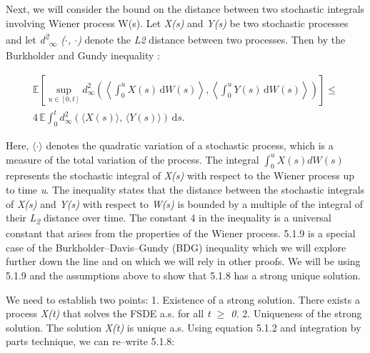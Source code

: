 \documentclass[12pt,a4paper]{report}
\numberwithin{equation}{section}
\begin{document}
Next, we will consider the bound on the distance between two stochastic
integrals involving Wiener process W(s). Let \emph{X(s)} and \emph{Y(s)}
be two stochastic processes and let
\emph{d\textsuperscript{2}\textsubscript{$\infty$} ($\cdot$, $\cdot$)} denote the \emph{L2}
distance between two processes. Then by the Burkholder and Gundy
inequality \cite{dl1979extrapolation_85}:

\begin{equation}\tag{5.1.9}\label{eq:5.1.9}
\begin{gathered}
\mathbb{E}\!\left[\sup_{u\in[0,t]}
d_{\infty}^{2}\!\left(
\left\langle \int_{0}^{u} X(s)\,\mathrm{d}W(s)\right\rangle,
\left\langle \int_{0}^{u} Y(s)\,\mathrm{d}W(s)\right\rangle
\right)\right]
\le \\[2pt]
4\,\mathbb{E}\!\int_{0}^{t}
d_{\infty}^{2}\!\left(\langle X(s)\rangle,\,\langle Y(s)\rangle\right)\,\mathrm{d}s.
\end{gathered}
\end{equation}



Here, $\langle$$\cdot$$\rangle$ denotes the quadratic variation of a stochastic process,
which is a measure of the total variation of the process. The integral
\(\int_{0}^{u}{X(s)dW(s)}\)represents the stochastic integral of
\emph{X(s)} with respect to the Wiener process up to time \emph{u}. The
inequality states that the distance between the stochastic integrals of
\emph{X(s)} and \emph{Y(s)} with respect to \emph{W(s)} is bounded by a
multiple of the integral of their \emph{L\textsubscript{2}} distance over time. The
constant 4 in the inequality is a universal constant that arises from
the properties of the Wiener process. 5.1.9 is a special case of the
Burkholder--Davis--Gundy (BDG) inequality which we will explore further
down the line and on which we will rely in other proofs. We will be
using 5.1.9 and the assumptions above to show that 5.1.8 has a strong
unique solution.

We need to establish two points: 1. Existence of a strong solution.
There exists a process \emph{X(t)} that solves the FSDE a.s. for all
\emph{t $\geq$ 0.} 2. Uniqueness of the strong solution. The solution
\emph{X(t)} is unique a.s. Using equation 5.1.2 and integration by parts
technique, we can re--write 5.1.8:
\end{document}
